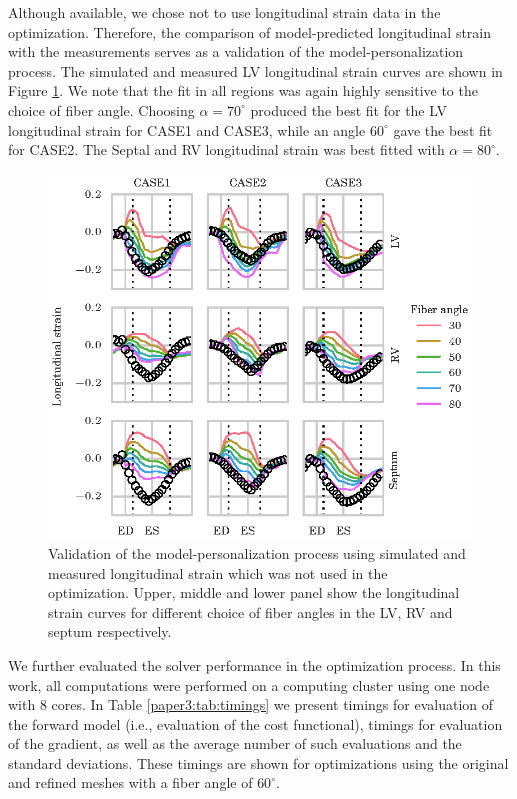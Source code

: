 Although available, we chose not to use longitudinal strain data in the
optimization. Therefore, the comparison of model-predicted
longitudinal strain with the measurements serves as a validation of the
model-personalization process. The simulated and measured LV
longitudinal strain curves are shown in Figure
\ref{paper3:fig:fiber_long}. We note that the fit in all regions was again highly sensitive
to the choice of fiber angle. Choosing $\alpha = 70^{\circ}$ produced the best
fit for the LV longitudinal strain for CASE1 and CASE3, while an angle
$60^{\circ}$ gave the best fit for CASE2. The Septal and RV
longitudinal strain was best fitted with $\alpha = 80^{\circ}$.  


\begin{figure}[htbp]
 \centering
  \includegraphics[width=\textwidth]{figures/longitudinal_strain}
  \caption{\label{paper3:fig:fiber_long}Validation of the
    model-personalization process using simulated and measured
  longitudinal strain which was not used in the optimization. Upper,
  middle and lower panel show the longitudinal strain
  curves for different choice of fiber angles in the LV, RV and septum respectively.}
\end{figure}

We further evaluated the solver performance in the optimization process.  In this work, all computations were performed on a computing cluster using one node
with 8 cores. In Table \ref{paper3:tab:timings} we present timings for evaluation of
the forward model (i.e., evaluation of the cost functional), timings for
evaluation of the gradient, as well as the average number of such
evaluations and the standard deviations. These timings are shown for
optimizations using the original and refined meshes with a fiber
angle of $60^{\circ}$. 


